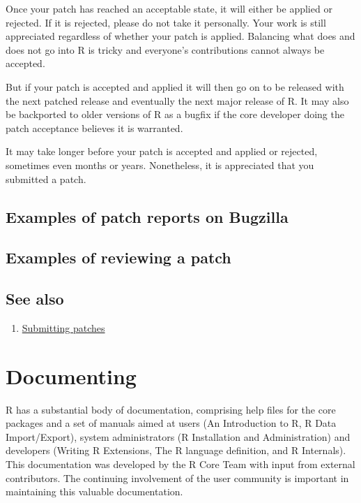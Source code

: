 \documentclass[
]{book}
\providecommand{\tightlist}{%
  \setlength{\itemsep}{0pt}\setlength{\parskip}{0pt}}
\begin{document}
Once your patch has reached an acceptable state, it will either be applied or rejected. If it is rejected, please do not take it personally. Your work is still appreciated regardless of whether your patch is applied. Balancing what does and does not go into R is tricky and everyone's contributions cannot always be accepted.

But if your patch is accepted and applied it will then go on to be released with the next patched release and eventually the next major release of R. It may also be backported to older versions of R as a bugfix if the core developer doing the patch acceptance believes it is warranted.

It may take longer before your patch is accepted and applied or rejected, sometimes even months or years. Nonetheless, it is appreciated that you submitted a patch.

\section{Examples of patch reports on Bugzilla}\label{examples-of-patch-reports-on-bugzilla}

\section{Examples of reviewing a patch}\label{examples-of-reviewing-a-patch}

\section{See also}\label{see-also-4}

\begin{enumerate}
\def\labelenumi{\arabic{enumi}.}
\tightlist
\item
  \href{https://www.r-project.org/bugs.html\#how-to-submit-patches}{Submitting patches}
\end{enumerate}

\chapter{Documenting}\label{Doc}

R has a substantial body of documentation, comprising help files for the core packages and a set of manuals aimed at users (An Introduction to R, R Data Import/Export), system administrators (R Installation and Administration) and developers (Writing R Extensions, The R language definition, and R Internals). This documentation was developed by the R Core Team with input from external contributors. The continuing involvement of the user community is important in maintaining this valuable documentation.
\end{document}
